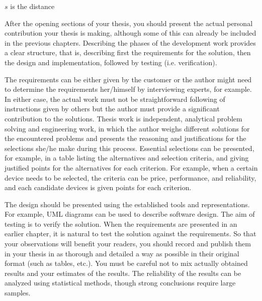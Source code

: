 \DIFdelend \DIFaddbegin {}\DIFaddend $s$ is the distance \DIFdelbegin {}\DIFdelend \DIFaddbegin {}\DIFaddend 

After the opening sections of your thesis, you should present the actual personal contribution your thesis is making, although some of this can already be included in the previous chapters. Describing the phases of the development work provides a clear structure, that is, describing first the requirements for the solution, then the design and implementation, followed by testing (i.e. verification).

The requirements can be either given by the customer or the author might need to determine the requirements her/himself by interviewing experts, for example. In either case, the actual work must not be straightforward following of instructions given by others but the author must provide a significant contribution to the solutions. Thesis work is independent, analytical problem solving and engineering work, in which the author weighs different solutions for the encountered problems and presents the reasoning and justifications for the selections she/he make during this process. Essential selections can be presented, for example, in a table listing the alternatives and selection criteria, and giving justified points for the alternatives for each criterion. For example, when a certain device needs to be selected, the criteria can be price, performance, and reliability, and each candidate devices is given points for each criterion.

The design should be presented using the established tools and representations. For example, UML diagrams can be used to describe software design. The aim of testing is to verify the solution. When the requirements are presented in an earlier chapter, it is natural to test the solution against the requirements. So that your observations will benefit your readers, you should record and publish them in your thesis in as thorough and detailed a way as possible in their original format (such as tables, etc.). You must be careful not to mix actually obtained results and your estimates of the results. The reliability of the results can be analyzed using statistical methods, though strong conclusions require large samples.

